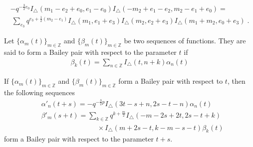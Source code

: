 \documentclass[10pt,a4paper]{amsart}
\begin{document}
\begin{multline}\label{pentagonfinal}
    -q^{-\frac{3}{2}e_0}{I_{\triangle}}(m_1 - e_2 + e_0,e_1 - e_0){I_{\triangle}}(-m_2 + e_1 - e_2, m_2 - e_1 + e_0)= \\ 
    \ \sum_{e_3} q^{e_3 + \frac{1}{2}(m_2 - e_1)} {I_{\triangle}}(m_1, e_1 + e_3) {I_{\triangle}}(m_2, e_2 + e_3) {I_{\triangle}}(m_1 + m_2 ,e_0 + e_3)  \;. \end{multline}

\begin{definition}
Let $\{\alpha_m(t)\}_{m \in \mathbb{Z}}$ and $\{\beta_m(t)\}_{m \in \mathbb{Z}}$ be two sequences of functions. They are said to form a Bailey pair with respect to the parameter $t$ if
\begin{align}\label{baileydef1}
        \beta_k (t)= \sum_{n \in \mathbb{Z}} I_{\triangle}(t, n + k) \alpha_n(t)
\end{align}
\end{definition}

\begin{lemma}
If $\{\alpha_m(t)\}_{m \in \mathbb{Z}}$ and $\{\beta_m(t)\}_{m \in \mathbb{Z}}$ form a Bailey pair with respect to $t$, then the following sequences
\begin{align}
            & \alpha'_n(t + s)= -q^{-\frac{3}{2}p} I_{\triangle}(3t - s + n,2s - t  - n)\alpha_n(t) \label{baileydef_a} \\ 
            & \nonumber \beta'_m(s + t)=\sum_{k \in \mathbb{Z}}q^{k + \frac{m}{2}}  I_{\triangle}(-m - 2s + 2t,2s - t + k) \\
            & \qquad \qquad \qquad \qquad \times I_{\triangle}(m + 2s - t,k - m - s - t) \beta_k(t)
            \label{baileydef2}
\end{align}
\vspace{-0.5cm}
form a Bailey pair with respect to the parameter $t + s$.
\end{lemma}
\end{document}
